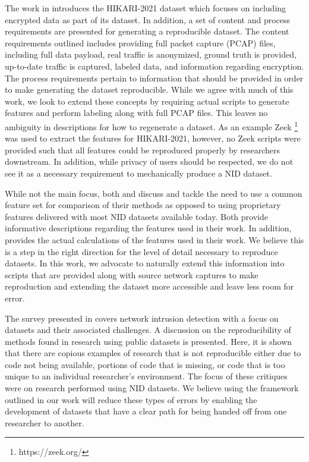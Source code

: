 \documentclass[conference]{IEEEtran}
\begin{document}
The work in \cite{ferriyan2021} introduces the HIKARI-2021 dataset which focuses on including encrypted data as part of its dataset.
In addition, a set of content and process requirements are presented for generating a reproducible dataset.
The content requirements outlined includes providing full packet capture (PCAP) files, including full data payload, real traffic is anonymized, ground truth is provided, up-to-date traffic is captured, labeled data, and information regarding encryption.
The process requirements pertain to information that should be provided in order to make generating the dataset reproducible.
While we agree with much of this work, we look to extend these concepts by requiring actual scripts to generate features and perform labeling along with full PCAP files.
This leaves no ambiguity in descriptions for how to regenerate a dataset.
As an example Zeek \footnote{https://zeek.org/} was used to extract the features for HIKARI-2021, however, no Zeek scripts were provided such that all features could be reproduced properly by researchers downstream.
In addition, while privacy of users should be respected, we do not see it as a necessary requirement to mechanically produce a NID dataset.

While not the main focus, both \cite{e23111532} and \cite{layeghy2021} discuss and tackle the need to use a common feature set for comparison of their methods as opposed to using proprietary features delivered with most NID datasets available today.
Both provide informative descriptions regarding the features used in their work.
In addition, \cite{layeghy2021} provides the actual calculations of the features used in their work.
We believe this is a step in the right direction for the level of detail necessary to reproduce datasets.
In this work, we advocate to naturally extend this information into scripts that are provided along with source network captures to make reproduction and extending the dataset more accessible and leave less room for error.

The survey presented in \cite{Chou2022} covers network intrusion detection with a focus on datasets and their associated challenges.
A discussion on the reproducibility of methods found in research using public datasets is presented.
Here, it is shown that there are copious examples of research that is not reproducible either due to code not being available, portions of code that is missing, or code that is too unique to an individual researcher's environment.
The focus of these critiques were on research performed using NID datasets.
We believe using the framework outlined in our work will reduce these types of errors by enabling the development of datasets that have a clear path for being handed off from one researcher to another.
\end{document}
